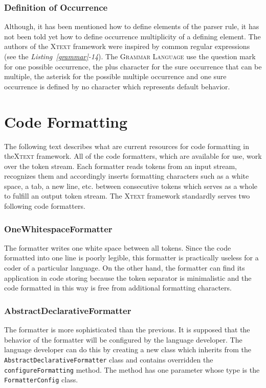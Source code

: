 \documentclass[12pt,notitlepage,a4paper]{report}
\begin{document}
\subsubsection{Definition of Occurrence}

Although, it has been mentioned how to define elements of the parser rule, it has not been told yet how to define occurrence multiplicity of a defining element. The authors of the \textsc{Xtext} framework were inspired by common regular expressions (see the \textit{Listing~\ref{grammar}-14}). The \textsc{Grammar Language} use the question mark for one possible occurrence, the plus character for the sure occurrence that can be multiple, the asterisk for the possible multiple occurrence and one sure occurrence is defined by no character which represents default behavior.

\section{Code Formatting}
\label{CodeFormatting}
The following text describes what are current resources for code formatting in the\textsc{Xtext} framework. All of the code formatters, which are available for use, work over the token stream. Each formatter reads tokens from an input stream, recognizes them and accordingly inserts formatting characters such as a white space, a tab, a new line, etc. between consecutive tokens which serves as a whole to fulfill an output token stream. The \textsc{Xtext} framework standardly serves two following code formatters.

\subsubsection{OneWhitespaceFormatter}

The formatter writes one white space between all tokens. Since the code formatted into one line is poorly legible, this formatter is practically useless for a coder of a particular language. On the other hand, the formatter can find its application in code storing because the token separator is minimalistic and the code formatted in this way is free from additional formatting characters. 

\subsubsection{AbstractDeclarativeFormatter}

The formatter is more sophisticated than the previous. It is supposed that the behavior of the formatter will be configured by the language developer. The language developer can do this by creating 
a new class which inherits from the \texttt{AbstractDeclarativeFormatter} class and contains overridden the \texttt{configureFormatting} method. The method has one parameter whose type is the \texttt{FormatterConfig} class. 
\end{document}
